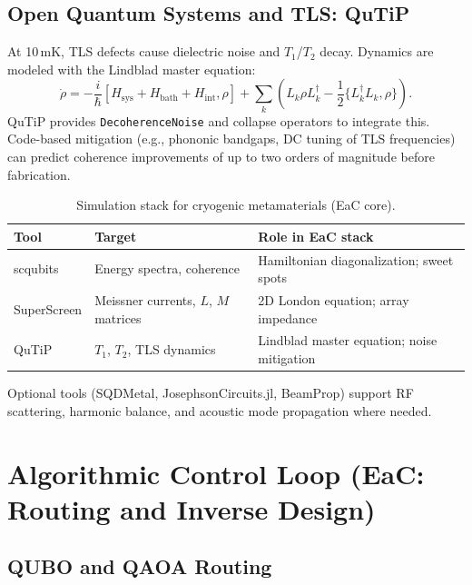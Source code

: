 \documentclass[11pt, a4paper]{article}
\begin{document}
\subsection{Open Quantum Systems and TLS: QuTiP}

At 10\,mK, TLS defects cause dielectric noise and $T_1$/$T_2$ decay. Dynamics are modeled with the Lindblad master equation:
\begin{equation}
\dot{\rho} = -\frac{i}{\hbar}[H_{\mathrm{sys}} + H_{\mathrm{bath}} + H_{\mathrm{int}}, \rho] + \sum_k \left( L_k \rho L_k^\dagger - \frac{1}{2}\{L_k^\dagger L_k, \rho\} \right).
\end{equation}
QuTiP provides \texttt{DecoherenceNoise} and collapse operators to integrate this. Code-based mitigation (e.g., phononic bandgaps, DC tuning of TLS frequencies) can predict coherence improvements of up to two orders of magnitude before fabrication.

\begin{table}[htbp]
\centering
\renewcommand{\arraystretch}{1.35}
\begin{tabularx}{\textwidth}{>{\raggedright\arraybackslash}p{2.2cm}>{\raggedright\arraybackslash}X>{\raggedright\arraybackslash}X}
\toprule
\textbf{Tool} & \textbf{Target} & \textbf{Role in EaC stack} \\
\midrule
scqubits & Energy spectra, coherence & Hamiltonian diagonalization; sweet spots \\
SuperScreen & Meissner currents, $L$, $M$ matrices & 2D London equation; array impedance \\
QuTiP & $T_1$, $T_2$, TLS dynamics & Lindblad master equation; noise mitigation \\
\bottomrule
\end{tabularx}
\caption{Simulation stack for cryogenic metamaterials (EaC core).}
\end{table}

Optional tools (SQDMetal, JosephsonCircuits.jl, BeamProp) support RF scattering, harmonic balance, and acoustic mode propagation where needed.

\section{Algorithmic Control Loop (EaC: Routing and Inverse Design)}

\subsection{QUBO and QAOA Routing}
\end{document}
